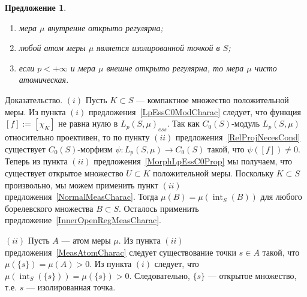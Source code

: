 \documentclass[12pt]{article}
\numberwithin{equation}{subsection}
\theoremstyle{plain}
\newtheorem{proposition}{Предложение}
\newenvironment{proof}{Доказательство.}{}
\begin{document}
\begin{fulltext}
\begin{proposition}
        \begin{enumerate}[label = (\roman*)]
            \item мера $\mu$ внутренне открыто регулярна;

            \item любой атом меры $\mu$ является изолированной точкой в $S$;

            \item если $p<+\infty$ и мера $\mu$ внешне открыто регулярна, то
                  мера $\mu$ чисто атомическая.
        \end{enumerate}
    \end{proposition}
    \begin{proof} $(i)$ Пусть $K\subset S$ --- компактное множество
        положительной меры. Из пункта $(i)$ предложения~\ref{LpEssC0ModCharac}
        следует, что функция $[f]:=[\chi_K]$ не равна нулю в
        ${L_p(S,\mu)}_{ess}$. Так как $C_0(S)$-модуль $L_p(S,\mu)$ относительно
        проективен, то по пункту $(ii)$ предложения~\ref{RelProjNecesCond}
        существует $C_0(S)$-морфизм $\psi:L_p(S,\mu)\to C_0(S)$ такой, что
        $\psi([f])\neq 0$. Теперь из пункта $(ii)$
        предложения~\ref{MorphLpEssC0Prop} мы получаем, что существует открытое
        множество $U\subset K$ положительной меры. Поскольку $K\subset S$
        произвольно, мы можем применить пункт $(ii)$
        предложения~\ref{NormalMeasCharac}. Тогда
        $\mu(B)=\mu(\operatorname{int}_S(B))$ для любого борелевского множества
        $B\subset S$. Осталось применить
        предложение~\ref{InnerOpenRegMeasCharac}.

        $(ii)$ Пусть $A$ --- атом меры $\mu$. Из пункта $(ii)$
        предложения~\ref{MeasAtomCharac} следует существование точки $s\in A$
        такой, что $\mu(\{s\})=\mu(A)>0$. Из пункта $(i)$ следует, что
        $\mu(\operatorname{int}_S(\{s\}))=\mu(\{s\})>0$. Следовательно, $\{s\}$
        --- открытое множество, т.е. $s$ --- изолированная точка.


\end{proof}
\end{fulltext}
\end{document}
